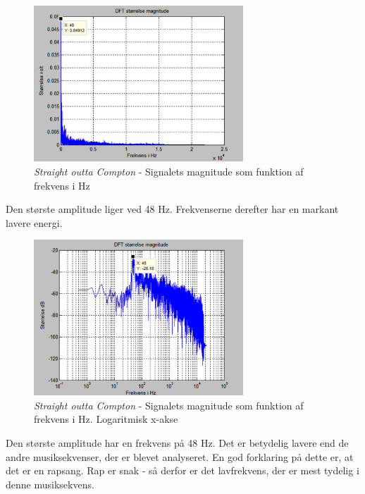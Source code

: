 \begin{figure}[H]
	\centering
	\includegraphics[width=0.7\textwidth]{Figurer/Snip20151001_17}
	\caption{\textit{Straight outta Compton} - Signalets magnitude som funktion af frekvens i Hz}
\end{figure}

Den største amplitude liger ved 48 Hz. Frekvenserne derefter har en markant lavere energi.

\begin{figure}[H]
	\centering
	\includegraphics[width=0.7\textwidth]{Figurer/Snip20151001_18}
	\caption{\textit{Straight outta Compton} - Signalets magnitude som funktion af frekvens i Hz. Logaritmisk x-akse}
\end{figure} 

Den største amplitude har en frekvens på 48 Hz. Det er betydelig lavere end de andre musiksekvenser, der er blevet analyseret. En god forklaring på dette er, at det er en rapsang. Rap er snak - så derfor er det lavfrekvens, der er mest tydelig i denne musiksekvens.  


